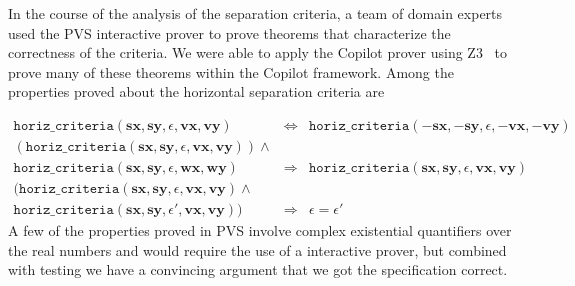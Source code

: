 In the course of the analysis of the separation criteria, a team of
domain experts used the PVS interactive prover to prove theorems that
characterize the correctness of the criteria.  We were able to apply
the Copilot prover using Z3~\cite{XXX} to prove many of these theorems
within the Copilot framework. Among the properties proved about the
horizontal separation criteria are

\begin{eqnarray*}
\texttt{horiz\_criteria}(\bm{sx},  \bm{sy},
\epsilon,  \bm{vx},  \bm{vy}) & \Longleftrightarrow &
\texttt{horiz\_criteria}(\bm{-sx},  \bm{-sy},
\epsilon, \bm{-vx},  \bm{-vy})   \\
( \texttt{horiz\_criteria}(\bm{sx},\bm{sy},
\epsilon, \bm{vx},\bm{vy}) ) \wedge &&  \\ 
\texttt{horiz\_criteria} (\bm{sx},  \bm{sy},
\epsilon,  \bm{wx}, \bm{wy})& \Longrightarrow&
\texttt{horiz\_criteria} (\bm{sx}, \bm{sy},
\epsilon,\bm{vx},\bm{vy})\\
( \texttt{horiz\_criteria}(\bm{sx},  \bm{sy},
\epsilon,  \bm{vx},  \bm{vy})  \wedge  &&\\
\texttt{horiz\_criteria}(\bm{sx},  \bm{sy},
\epsilon',  \bm{vx},  \bm{vy}) )  &\Longrightarrow & \epsilon = \epsilon'
\end{eqnarray*}
A few of the properties proved in PVS  involve complex existential quantifiers over
the real numbers and would require the use of a interactive prover,
but combined with testing we have a convincing argument that we got the
specification correct. 


%
%




